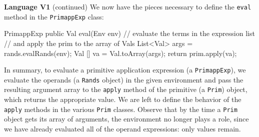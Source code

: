 \begin{minipage}[t]{\sw}
\slidenumber
\LARGE
{\bf Language V1} (continued)\exx
We now have the pieces necessary to define the \verb'eval' method
in the \verb'PrimappExp' class:
{\Large
\begin{qv}
PrimappExp
    public Val eval(Env env) {
        // evaluate the terms in the expression list
        // and apply the prim to the array of Vals
        List<Val> args = rands.evalRands(env);
        Val [] va = Val.toArray(args);
        return prim.apply(va);
    }
\end{qv}
}
In summary,
to evaluate a primitive application expression (a \verb'PrimappExp'),
we evaluate the operands (a \verb'Rands' object) in the given environment
and pass the resulting argument array to the \verb'apply' method
of the primitive (a \verb'Prim') object,
which returns the appropriate value.\exx
We are left to define the behavior of the \verb'apply' methods
in the various \verb'Prim' classes.
Observe that by the time a \verb'Prim'
object gets its array of arguments,
the environment no longer plays a role,
since we have already evaluated all of the operand expressions:
only values remain.
\end{minipage}
\clearpage
